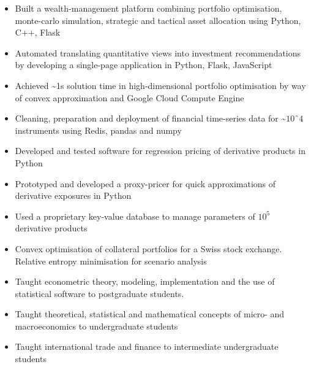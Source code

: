 \documentclass[10pt,a4paper,ragged2e]{altacv}
\begin{document}
\begin{paracol}{2}


\begin{itemize}
\item Built a wealth-management platform combining portfolio optimisation, monte-carlo simulation,
strategic and tactical asset allocation using Python, C++, Flask
\item Automated translating quantitative views into investment recommendations
by developing a single-page application in Python, Flask, JavaScript
\item Achieved \textasciitilde 1s solution time in high-dimensional portfolio optimisation by
way of convex approximation and Google Cloud Compute Engine 
\item Cleaning, preparation and deployment of financial time-series data for \textasciitilde $10ˆ4$ 
instruments using Redis, pandas and numpy

\end{itemize}

\divider

\begin{itemize}
\item Developed and tested software for regression pricing of derivative products in Python
\item Prototyped and developed a proxy-pricer for quick approximations of derivative exposures in Python
\item Used a proprietary key-value database to manage parameters of $10^5$ derivative products 
\item Convex optimisation of collateral portfolios for a Swiss stock exchange. 
Relative entropy minimisation for scenario analysis
\end{itemize}

\divider

\begin{itemize}
\item Taught econometric theory, modeling, implementation and the use of statistical software to postgraduate students. 
\item Taught theoretical, statistical and mathematical concepts of micro- and macroeconomics to undergraduate students
\item Taught international trade and finance to intermediate undergraduate students
\end{itemize}




\end{paracol}
\end{document}
